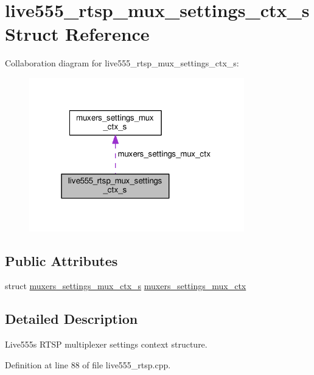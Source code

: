 \hypertarget{structlive555__rtsp__mux__settings__ctx__s}{}\section{live555\+\_\+rtsp\+\_\+mux\+\_\+settings\+\_\+ctx\+\_\+s Struct Reference}
\label{structlive555__rtsp__mux__settings__ctx__s}


Collaboration diagram for live555\+\_\+rtsp\+\_\+mux\+\_\+settings\+\_\+ctx\+\_\+s\+:\nopagebreak
\begin{figure}[H]
\begin{center}
\leavevmode
\includegraphics[width=265pt]{structlive555__rtsp__mux__settings__ctx__s__coll__graph}
\end{center}
\end{figure}
\subsection*{Public Attributes}
\begin{DoxyCompactItemize}
\item 
struct \hyperlink{structmuxers__settings__mux__ctx__s}{muxers\+\_\+settings\+\_\+mux\+\_\+ctx\+\_\+s} \hyperlink{structlive555__rtsp__mux__settings__ctx__s_ab882e923aec197102778eaa816fa940b}{muxers\+\_\+settings\+\_\+mux\+\_\+ctx}
\end{DoxyCompactItemize}


\subsection{Detailed Description}
Live555\textquotesingle{}s R\+T\+SP multiplexer settings context structure. 

Definition at line 88 of file live555\+\_\+rtsp.\+cpp.



